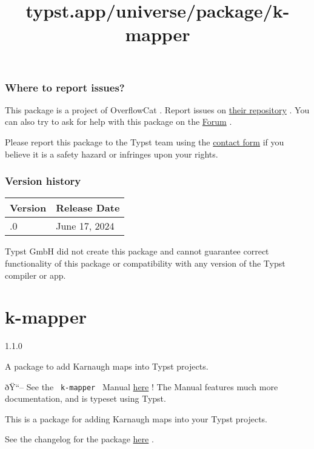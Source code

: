 \subsubsection{Where to report issues?}\label{where-to-report-issues}

This package is a project of OverflowCat . Report issues on
\href{https://github.com/OverflowCat/sigfig}{their repository} . You can
also try to ask for help with this package on the
\href{https://forum.typst.app}{Forum} .

Please report this package to the Typst team using the
\href{https://typst.app/contact}{contact form} if you believe it is a
safety hazard or infringes upon your rights.

\label{versions}
\subsubsection{Version history}\label{version-history}

\begin{longtable}[]{@{}ll@{}}
\toprule\noalign{}
Version & Release Date \\
\midrule\noalign{}
\endhead
\bottomrule\noalign{}
\endlastfoot
0.1.0 & June 17, 2024 \\
\end{longtable}

Typst GmbH did not create this package and cannot guarantee correct
functionality of this package or compatibility with any version of the
Typst compiler or app.


\title{typst.app/universe/package/k-mapper}

\label{banner}
\section{k-mapper}\label{k-mapper}

{ 1.1.0 }

A package to add Karnaugh maps into Typst projects.

\label{readme}
ðŸ``-- See the \texttt{\ k-mapper\ } Manual
\href{https://github.com/derekchai/k-mapper/blob/1f334d9e0f02cc656c01835302474bf728db9f80/manual.pdf}{here}
! The Manual features much more documentation, and is typeset using
Typst.

This is a package for adding Karnaugh maps into your Typst projects.

See the changelog for the package
\href{https://github.com/derekchai/k-mapper/blob/698e8554ce67e3a61dd30319ab8f712a6a6b8daa/changelog.md}{here}
.

